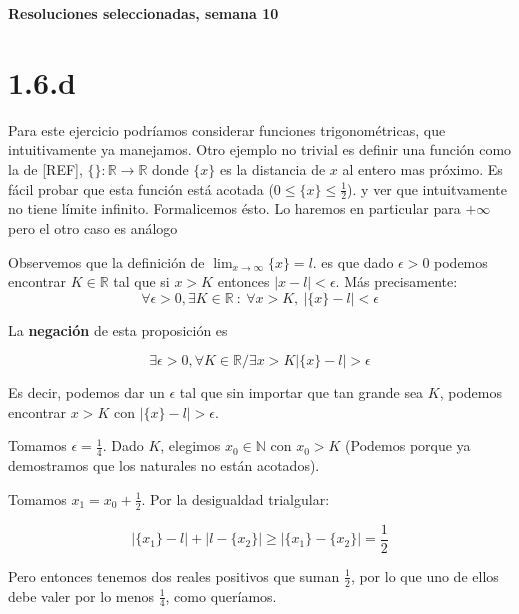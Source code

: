 \documentclass[10pt,a4paper]{article}
\begin{document}
\vspace{0,3cm}

\begin{center}
{\bf \Large Resoluciones seleccionadas, semana 10}
\end{center}


\vspace{0,3cm}

\section*{1.6.d}\emph{}

\noindent
Para este ejercicio podr\'iamos considerar funciones
trigonom\'etricas, que intuitivamente ya manejamos.
Otro ejemplo no trivial es definir una funci\'on como la de [REF],
$\{ \} : \mathbb{R}\rightarrow\mathbb{R}$ donde $\{x\}$ es la distancia
de $x$ al entero mas pr\'oximo.
Es f\'acil probar que esta funci\'on est\'a acotada
($0\leq\{x\}\leq\frac{1}{2}$). y ver que intuitvamente no tiene l\'imite
infinito. Formalicemos \'esto. Lo haremos en particular para $+\infty$
pero el otro caso es an\'alogo

\noindent
Observemos que la definici\'on de $\displaystyle{\lim_{x\rightarrow \infty}
  \{x\}= l}$.
es que dado $\epsilon > 0$ podemos encontrar
$K\in\mathbb{R}$ tal que si $x > K$ entonces $|x-l|<\epsilon$.
M\'as precisamente:
$$
\forall \epsilon>0, \exists K\in\mathbb{R} \: : \: \forall x>K, \: |\{x\}-l|<
\epsilon
$$

\noindent
La {\bf negaci\'on} de esta proposici\'on es 

$$
\exists \epsilon>0, \forall K\in\mathbb{R} / \exists x>K |\{x\}-l|>\epsilon
$$

\noindent
Es decir, podemos dar un $\epsilon$ tal que sin importar que tan grande sea
$K$, podemos encontrar $x>K$ con $|\{x\}-l|>\epsilon$.

\noindent
Tomamos $\epsilon=\frac{1}{4}$. Dado $K$, elegimos $x_0\in\mathbb{N}$ con
$x_0>K$ (Podemos porque ya demostramos que los naturales no est\'an acotados).

\noindent
Tomamos $x_1 = x_0 + \frac{1}{2}$.
Por la desigualdad trialgular:

$$
|\{x_1\} - l| + |l - \{x_2\}| \geq |\{x_1\} - \{x_2\}| = \frac{1}{2}
$$

\noindent
Pero entonces tenemos dos reales positivos que suman $\frac{1}{2}$, por lo que
uno de ellos debe valer por lo menos $\frac{1}{4}$, como quer\'iamos.
\end{document}
